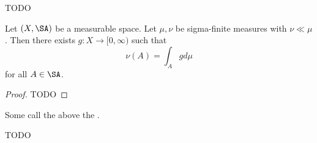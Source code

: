 
\sbasic



\sstart



TODO



\begin{prop}
Let $(X, \SA)$
be a measurable space.
Let $\mu,\nu$
be sigma-finite measures
with $\nu \ll \mu$.
Then there exists
$g: X \to [0, \infty)$
such that
\[
  \nu(A) = \int_A g d\mu
\]
for all $A \in \SA$.
\begin{proof}
TODO
\end{proof}
\end{prop}
Some call the above the
.


TODO

\strats
